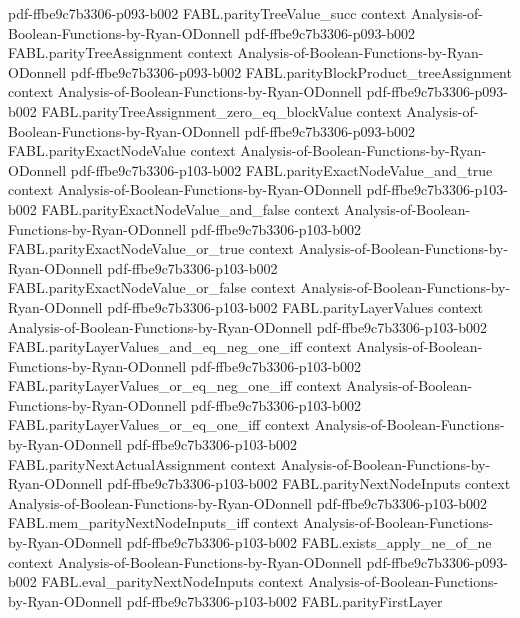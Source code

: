 \begin{theorem}
  {pdf-ffbe9c7b3306-p093-b002}
\proofstep
  {FABL.parityTreeValue_succ}
  {context}
  {Analysis-of-Boolean-Functions-by-Ryan-ODonnell}
  {pdf-ffbe9c7b3306-p093-b002}
\proofstep
  {FABL.parityTreeAssignment}
  {context}
  {Analysis-of-Boolean-Functions-by-Ryan-ODonnell}
  {pdf-ffbe9c7b3306-p093-b002}
\proofstep
  {FABL.parityBlockProduct_treeAssignment}
  {context}
  {Analysis-of-Boolean-Functions-by-Ryan-ODonnell}
  {pdf-ffbe9c7b3306-p093-b002}
\proofstep
  {FABL.parityTreeAssignment_zero_eq_blockValue}
  {context}
  {Analysis-of-Boolean-Functions-by-Ryan-ODonnell}
  {pdf-ffbe9c7b3306-p093-b002}
\proofstep
  {FABL.parityExactNodeValue}
  {context}
  {Analysis-of-Boolean-Functions-by-Ryan-ODonnell}
  {pdf-ffbe9c7b3306-p103-b002}
\proofstep
  {FABL.parityExactNodeValue_and_true}
  {context}
  {Analysis-of-Boolean-Functions-by-Ryan-ODonnell}
  {pdf-ffbe9c7b3306-p103-b002}
\proofstep
  {FABL.parityExactNodeValue_and_false}
  {context}
  {Analysis-of-Boolean-Functions-by-Ryan-ODonnell}
  {pdf-ffbe9c7b3306-p103-b002}
\proofstep
  {FABL.parityExactNodeValue_or_true}
  {context}
  {Analysis-of-Boolean-Functions-by-Ryan-ODonnell}
  {pdf-ffbe9c7b3306-p103-b002}
\proofstep
  {FABL.parityExactNodeValue_or_false}
  {context}
  {Analysis-of-Boolean-Functions-by-Ryan-ODonnell}
  {pdf-ffbe9c7b3306-p103-b002}
\proofstep
  {FABL.parityLayerValues}
  {context}
  {Analysis-of-Boolean-Functions-by-Ryan-ODonnell}
  {pdf-ffbe9c7b3306-p103-b002}
\proofstep
  {FABL.parityLayerValues_and_eq_neg_one_iff}
  {context}
  {Analysis-of-Boolean-Functions-by-Ryan-ODonnell}
  {pdf-ffbe9c7b3306-p103-b002}
\proofstep
  {FABL.parityLayerValues_or_eq_neg_one_iff}
  {context}
  {Analysis-of-Boolean-Functions-by-Ryan-ODonnell}
  {pdf-ffbe9c7b3306-p103-b002}
\proofstep
  {FABL.parityLayerValues_or_eq_one_iff}
  {context}
  {Analysis-of-Boolean-Functions-by-Ryan-ODonnell}
  {pdf-ffbe9c7b3306-p103-b002}
\proofstep
  {FABL.parityNextActualAssignment}
  {context}
  {Analysis-of-Boolean-Functions-by-Ryan-ODonnell}
  {pdf-ffbe9c7b3306-p103-b002}
\proofstep
  {FABL.parityNextNodeInputs}
  {context}
  {Analysis-of-Boolean-Functions-by-Ryan-ODonnell}
  {pdf-ffbe9c7b3306-p103-b002}
\proofstep
  {FABL.mem_parityNextNodeInputs_iff}
  {context}
  {Analysis-of-Boolean-Functions-by-Ryan-ODonnell}
  {pdf-ffbe9c7b3306-p103-b002}
\proofstep
  {FABL.exists_apply_ne_of_ne}
  {context}
  {Analysis-of-Boolean-Functions-by-Ryan-ODonnell}
  {pdf-ffbe9c7b3306-p093-b002}
\proofstep
  {FABL.eval_parityNextNodeInputs}
  {context}
  {Analysis-of-Boolean-Functions-by-Ryan-ODonnell}
  {pdf-ffbe9c7b3306-p103-b002}
\proofstep
  {FABL.parityFirstLayer}

\end{theorem}
